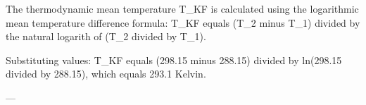 The thermodynamic mean temperature T_KF is calculated using the logarithmic mean temperature difference formula:  
T_KF equals (T_2 minus T_1) divided by the natural logarith of (T_2 divided by T_1).  

Substituting values:  
T_KF equals (298.15 minus 288.15) divided by ln(298.15 divided by 288.15), which equals 293.1 Kelvin.  

---